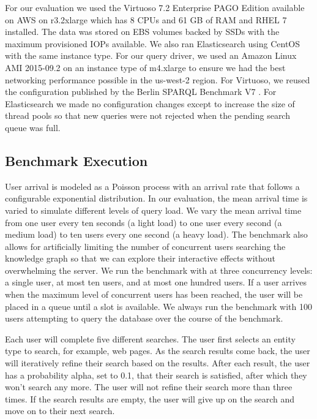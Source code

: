 For our evaluation we used the Virtuoso 7.2 Enterprise PAGO Edition\cite{virtuosopago} available on AWS on r3.2xlarge which has 8 CPUs and 61 GB of RAM and RHEL 7 installed.  
The data was stored on EBS volumes backed by SSDs with the maximum provisioned IOPs available. 
We also ran Elasticsearch using CentOS with the same instance type.  
For our query driver, we used an Amazon Linux AMI 2015-09.2 on an instance type of m4.xlarge to ensure we had the best networking performance possible in the us-west-2 region.    
For Virtuoso, we reused the configuration published by the Berlin SPARQL Benchmark V7 \cite{bsbmv7}.
For Elasticsearch we made no configuration changes except to increase the size of thread pools so that new queries were not rejected when the pending search queue was full. 

\subsection{Benchmark Execution}
User arrival is modeled as a Poisson process with an arrival rate that follows a configurable exponential distribution.  
In our evaluation, the mean arrival time is varied to simulate different levels of query load.  
We vary the mean arrival time from one user every ten seconds (a light load) to one user every second (a medium load) to ten users every one second (a heavy load).
The benchmark also allows for artificially limiting the number of concurrent users searching the knowledge graph so that we can explore their interactive effects without overwhelming the server.  
We run the benchmark with at three concurrency levels: a single user, at most ten users, and at most one hundred users.
If a user arrives when the maximum level of concurrent users has been reached, the user will be placed in a queue until a slot is available.  
We always run the benchmark with 100 users attempting to query the database over the course of the benchmark.

Each user will complete five different searches. 
The user first selects an entity type to search, for example, web pages.
As the search results come back, the user will iteratively refine their search based on the results.
After each result, the user has a probability alpha, set to 0.1, that their search is satisfied, after which they won't search any more.
The user will not refine their search more than three times.
If the search results are empty, the user will give up on the search and move on to their next search.

